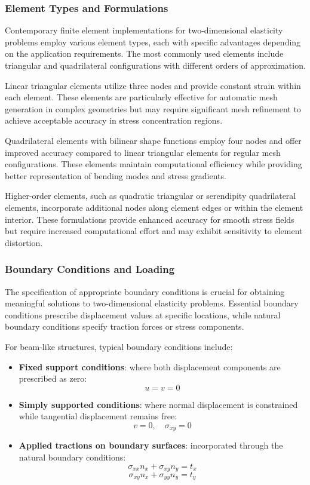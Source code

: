 \documentclass[12pt,a4paper]{report}
\begin{document}
\subsubsection{Element Types and Formulations}

Contemporary finite element implementations for two-dimensional elasticity problems employ various element types, each with specific advantages depending on the application requirements. The most commonly used elements include triangular and quadrilateral configurations with different orders of approximation.

Linear triangular elements utilize three nodes and provide constant strain within each element. These elements are particularly effective for automatic mesh generation in complex geometries but may require significant mesh refinement to achieve acceptable accuracy in stress concentration regions.

Quadrilateral elements with bilinear shape functions employ four nodes and offer improved accuracy compared to linear triangular elements for regular mesh configurations. These elements maintain computational efficiency while providing better representation of bending modes and stress gradients.

Higher-order elements, such as quadratic triangular or serendipity quadrilateral elements, incorporate additional nodes along element edges or within the element interior. These formulations provide enhanced accuracy for smooth stress fields but require increased computational effort and may exhibit sensitivity to element distortion.

\subsubsection{Boundary Conditions and Loading}

The specification of appropriate boundary conditions is crucial for obtaining meaningful solutions to two-dimensional elasticity problems. Essential boundary conditions prescribe displacement values at specific locations, while natural boundary conditions specify traction forces or stress components.

For beam-like structures, typical boundary conditions include:

\begin{itemize}
    \item \textbf{Fixed support conditions}: where both displacement components are prescribed as zero:
    \[
    u = v = 0
    \]

    \item \textbf{Simply supported conditions}: where normal displacement is constrained while tangential displacement remains free:
    \[
    v = 0, \quad \sigma_{xy} = 0
    \]

    \item \textbf{Applied tractions on boundary surfaces}: incorporated through the natural boundary conditions:
    \[
    \sigma_{xx} n_x + \sigma_{xy} n_y = t_x
    \]
    \[
    \sigma_{xy} n_x + \sigma_{yy} n_y = t_y
    \]
\end{itemize}
\end{document}
